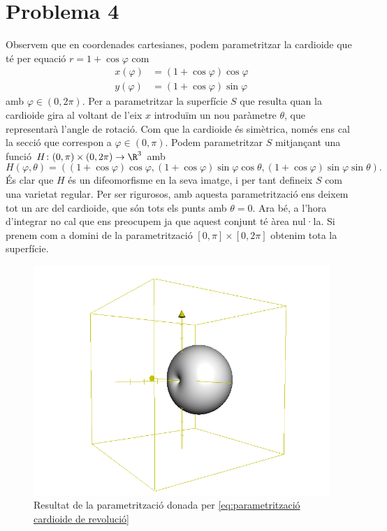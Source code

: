 \documentclass[12pt, a4paper]{article}
\begin{document}
\section{Problema 4} \label{sec:problema 4} 
Observem que en coordenades cartesianes, podem parametritzar la cardioide que té per equació \( r = 1 + \cos{\varphi} \) com
\begin{equation}
  \begin{aligned}
    x(\varphi) &= (1 + \cos{\varphi})\cos{\varphi} \\
    y(\varphi) &= (1 + \cos{\varphi})\sin{\varphi}
  \end{aligned}
	\label{eq:parametrització cardioide de revolució}
\end{equation}
amb \( \varphi \in (0, 2\pi) \). Per a parametritzar la superfície \( S \) que resulta quan la cardioide gira al voltant de l'eix \( x \) introduïm un nou paràmetre \( \theta \), que representarà l'angle de rotació. Com que la cardioide és simètrica, només ens cal la secció que correspon a \( \varphi \in (0, \pi) \). Podem parametritzar \( S \) mitjançant una funció \( H\colon (0,\pi) \times (0,2\pi) \to \R^3 \) amb 
\begin{equation}
   H(\varphi,\theta) = ((1+\cos{\varphi})\cos{\varphi}, (1+\cos{\varphi})\sin{\varphi}\cos{\theta}, (1+\cos{\varphi})\sin{\varphi}\sin{\theta}). \label{eq:cardioide de revolució}
\end{equation}
És clar que \( H \) és un difeomorfisme en la seva imatge, i per tant defineix \( S \) com una varietat regular. Per ser rigurosos, amb aquesta parametrització ens deixem tot un arc del cardioide, que són tots els punts amb \( \theta = 0 \). Ara bé, a l'hora d'integrar no cal que ens preocupem ja que aquest conjunt té àrea nul·la. Si prenem com a domini de la parametrització \( [0,\pi] \times [0,2\pi] \)	obtenim tota la superfície.

\begin{figure}[htb]
  \centering
  \includegraphics[scale = 0.4]{cardioide.jpg}
 	\caption{Resultat de la parametrització donada per \ref{eq:parametrització cardioide de revolució}} 
\end{figure}
\end{document}
